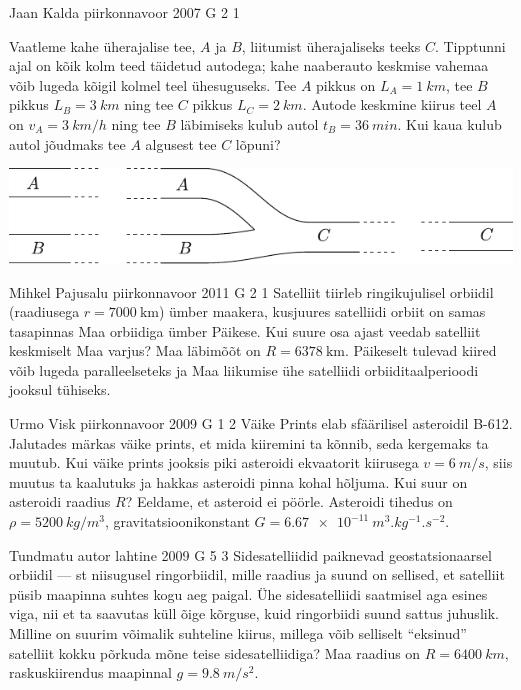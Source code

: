 \documentclass[11pt, twoside]{article}
\begin{document}
{%
{Jaan Kalda} %
{piirkonnavoor} %
{2007} %
{G 2} %
{1} %
{
\ifStatement
Vaatleme kahe üherajalise tee, $A$ ja $B$, liitumist üherajaliseks teeks $C$. Tipptunni ajal on kõik kolm teed täidetud autodega; kahe naaberauto keskmise vahemaa võib lugeda kõigil kolmel teel ühesuguseks. Tee $A$ pikkus on $L_A = \SI{1}{km}$, tee $B$ pikkus $L_B = \SI{3}{km}$ ning tee $C$ pikkus $L_C = \SI{2}{km}$. Autode keskmine kiirus teel $A$ on $v_A = \SI{3}{km/h}$ ning tee $B$ läbimiseks kulub autol $t_B = \SI{36}{min}$. Kui kaua kulub autol jõudmaks tee $A$ algusest tee $C$ lõpuni?
\begin{center}
	\includegraphics[width=0.9\linewidth]{2007-v2g-02-yl}
\end{center}
\fi
}

{Mihkel Pajusalu} %
{piirkonnavoor} %
{2011} %
{G 2} %
{1} %
{
\ifStatement
Satelliit tiirleb ringikujulisel orbiidil (raadiusega $r=\SI{7000}{\kilo\metre}$) ümber maakera, kusjuures satelliidi orbiit on samas tasapinnas Maa orbiidiga ümber Päikese. Kui suure osa ajast veedab satelliit keskmiselt Maa varjus? Maa läbimõõt on $R=\SI{6378}{\kilo\metre}$. Päikeselt tulevad kiired võib lugeda paralleelseteks ja Maa liikumise ühe satelliidi orbiiditaalperioodi jooksul tühiseks.
\fi
}

{Urmo Visk} %
{piirkonnavoor} %
{2009} %
{G 1} %
{2} %
{
\ifStatement
Väike Prints elab sfäärilisel asteroidil B-612. Jalutades märkas väike prints, et mida kiiremini ta kõnnib, seda kergemaks ta muutub. Kui väike prints jooksis piki asteroidi ekvaatorit kiirusega $v = \SI{6}{m/s}$, siis muutus ta kaalutuks ja hakkas asteroidi pinna kohal hõljuma. Kui suur on asteroidi raadius $R$? Eeldame, et asteroid ei pöörle. Asteroidi tihedus on $\rho = \SI{5200}{kg/m^3}$, gravitatsioonikonstant $G = \SI{6.67e-11}{m^3.kg^{-1}.s^{-2}}$.
\fi
}

{Tundmatu autor} %
{lahtine} %
{2009} %
{G 5} %
{3} %
{
\ifStatement
Sidesatelliidid paiknevad geostatsionaarsel orbiidil --- st niisugusel ringorbiidil, mille raadius ja suund on sellised, et satelliit püsib maapinna suhtes kogu aeg paigal. Ühe sidesatelliidi saatmisel aga esines viga, nii et ta saavutas küll õige kõrguse, kuid ringorbiidi suund sattus juhuslik. Milline on suurim võimalik suhteline kiirus, millega võib selliselt \enquote{eksinud} satelliit kokku põrkuda mõne teise sidesatelliidiga? Maa raadius on $R = \SI{6400}{km}$, raskuskiirendus maapinnal $g = \SI{9,8}{m/s^2}$.
\fi
}

}
\end{document}
